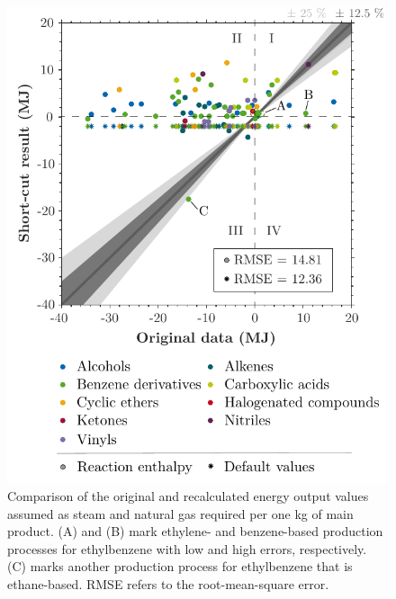 \begin{figure}[htp!]
        \centering
        \includegraphics{images/figure_1_clean.pdf}
        \caption{Comparison of the original and recalculated energy output values assumed as steam and natural gas required per one kg of main product. (A) and  (B) mark ethylene- and benzene-based production processes for ethylbenzene with low and high errors, respectively. (C) marks another production process for ethylbenzene that is ethane-based. RMSE refers to the root-mean-square error.}
        \label{fig:inventories}
\end{figure}

